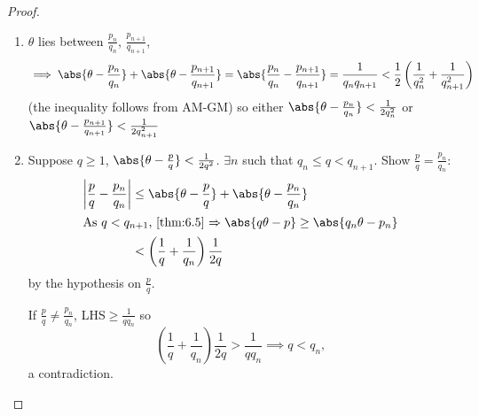 \documentclass{article}
\begin{document}
\begin{proof}
    \leavevmode
    \begin{enumerate}[label=(\roman*)]
        \item $\theta$ lies between $\frac{p_n}{q_n}$, $\frac{p_{n+1}}{q_{n+1}}$,
            \begin{equation*}
                \implies \abs{\theta - \frac{p_n}{q_n}} + \abs{\theta - \frac{p_{n+1}}{q_{n+1}}} = \abs{\frac{p_n}{q_n} - \frac{p_{n+1}}{q_{n+1}}} = \frac{1}{q_n q_{n+1}} < \frac{1}{2} \left(\frac{1}{q_n^2} + \frac{1}{q_{n+1}^2}\right)
            \end{equation*}
            (the inequality follows from AM-GM)
            so either $\abs{\theta - \frac{p_n}{q_n}} < \frac{1}{2 q_n^2}$ or $\abs{\theta - \frac{p_{n+1}}{q_{n+1}}} < \frac{1}{2 q_{n+1}^2}$
        \item Suppose $q \geq 1$, $\abs{\theta - \frac{p}{q}} < \frac{1}{2 q^2}$. $\exists n$ such that $q_n \leq q < q_{n+1}$. Show $\frac{p}{q} = \frac{p_n}{q_n}$:
            \begin{align*}
                \left|\frac{p}{q} - \frac{p_n}{q_n} \right| &\leq \abs{\theta - \frac{p}{q}} + \abs{\theta - \frac{p_n}{q_n}} \\
                \intertext{As $q < q_{n+1}$, \cref{thm:6.5} $\Rightarrow \abs{q \theta - p} \geq \abs{q_n \theta - p_n}$}
                &< \left(\frac{1}{q} + \frac{1}{q_n}\right) \frac{1}{2q}
            \end{align*}
            by the hypothesis on $\frac{p}{q}$.

            If $\frac{p}{q} \neq \frac{p_n}{q_n}$, LHS$ \geq \frac{1}{q q_n}$ so
            \begin{equation*}
                \left(\frac{1}{q} + \frac{1}{q_n}\right) \frac{1}{2q} > \frac{1}{q q_n} \implies q < q_n,
            \end{equation*}
            a contradiction. \qedhere
    \end{enumerate}
\end{proof}
\end{document}

